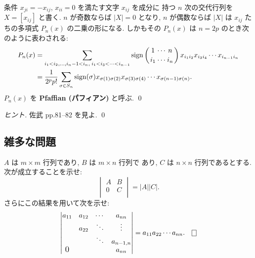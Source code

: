 \documentclass[12pt,twoside]{jarticle}
\begin{document}
\begin{question}
  条件 $x_{ji} = -x_{ij}$, $x_{ii}=0$ を満たす文字 $x_{ij}$ を成分に
  持つ $n$ 次の交代行列を $X=[x_{ij}]$ と書く.
  $n$ が奇数ならば $|X|=0$ となり,
  $n$ が偶数ならば $|X|$ は $x_{ij}$ たちの多項式 $P_n(x)$ の二乗の形になる.
  しかもその $P_n(x)$ は $n=2p$ のとき次のように表わされる:
  \begin{align*}
    P_n(x) 
    &= \sum_{i_1<i_2,\ldots,i_n-1<i_n,\; i_1<i_3<\cdots<i_{n-1}}
    \mathop{\mathrm{sign}}\nolimits\left({1\atop i_1}{\cdots\atop\cdots}{n\atop i_n}\right)
    x_{i_1i_2}x_{i_3i_4}\cdots x_{i_{n-1}i_n}
    \\
    &= \frac{1}{2^pp!}\sum_{\sigma\in S_n}
    \mathop{\mathrm{sign}}\nolimits(\sigma) 
    x_{\sigma(1)\sigma(2)}x_{\sigma(3)\sigma(4)}
    \cdots x_{\sigma(n-1)\sigma(n)}.
  \end{align*}
  $P_n(x)$ を {\bf Pfaffian (パフィアン)} と呼ぶ. \qed
\end{question}

\begin{proof}[ヒント]
  佐武 \cite{satake} pp.81--82 を見よ. \qed
\end{proof}


\subsection{雑多な問題}


\begin{question}
  $A$ は $m\times m$ 行列であり, $B$ は $m\times n$ 行列で
  あり, $C$ は $n\times n$ 行列であるとする. 
  次が成立することを示せ:
  \begin{equation*}
    \begin{vmatrix}
      A & B \\
      0 & C \\
    \end{vmatrix}
    = |A||C|.
  \end{equation*}
  さらにこの結果を用いて次を示せ:
  \begin{equation*}
    \begin{vmatrix}
      a_{11} & a_{12} & \cdots & a_{nn} \\
             & a_{22} & \ddots & \vdots \\
             &        & \ddots & a_{n-1,n} \\
      \bigzerol &     &        & a_{nn} \\
    \end{vmatrix}
    = a_{11}a_{22}\cdots a_{nn}.
    \qed
  \end{equation*}
\end{question}
\end{document}
